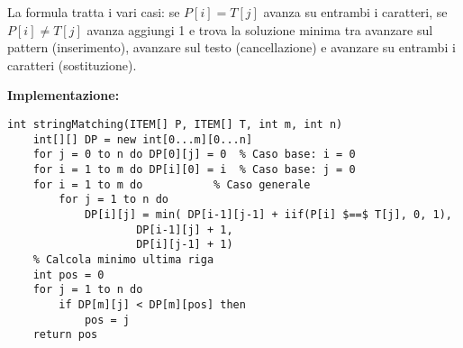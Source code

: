 \documentclass[../cheatSheetAlgoritmi.tex]{subfiles}
\begin{document}
\newpage
\begin{flushleft}
La formula tratta i vari casi: se $P[i]=T[j]$ avanza su entrambi i caratteri, se $P[i] \neq T[j]$ avanza aggiungi 1 e trova la soluzione minima tra avanzare sul pattern (inserimento), avanzare sul testo (cancellazione) e avanzare su entrambi i caratteri (sostituzione).
\end{flushleft}
\textbf{Implementazione:}
\begin{lstlisting}[caption=String matching approssimato]
int stringMatching(ITEM[] P, ITEM[] T, int m, int n)
	int[][] DP = new int[0...m][0...n]
	for j = 0 to n do DP[0][j] = 0  % Caso base: i = 0
	for i = 1 to m do DP[i][0] = i  % Caso base: j = 0
	for i = 1 to m do        	% Caso generale 
		for j = 1 to n do
			DP[i][j] = min( DP[i-1][j-1] + iif(P[i] $==$ T[j], 0, 1),	
					DP[i-1][j] + 1,
					DP[i][j-1] + 1)
	% Calcola minimo ultima riga
	int pos = 0 
	for j = 1 to n do
		if DP[m][j] < DP[m][pos] then
			pos = j
	return pos
\end{lstlisting}
\end{document}
